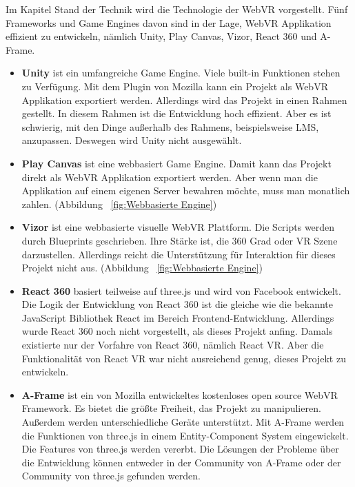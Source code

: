  Im Kapitel Stand der Technik wird die Technologie der WebVR vorgestellt. Fünf Frameworks und Game Engines davon sind in der Lage, WebVR Applikation effizient zu entwickeln, nämlich Unity, Play Canvas, Vizor, React 360 und A-Frame.
 
 \begin{itemize}
 
     \item \textbf{Unity} \citep{37} ist ein umfangreiche Game Engine. Viele built-in Funktionen stehen zu Verfügung. Mit dem Plugin von Mozilla kann ein Projekt als WebVR Applikation exportiert werden. Allerdings wird das Projekt in einen Rahmen gestellt. In diesem Rahmen ist die Entwicklung hoch effizient. Aber es ist schwierig, mit den Dinge außerhalb des Rahmens, beispielsweise LMS, anzupassen. Deswegen wird Unity nicht ausgewählt.
     
     \item \textbf{Play Canvas} \citep{38} ist eine webbasiert Game Engine. Damit kann das Projekt direkt als WebVR Applikation exportiert werden. Aber wenn man die Applikation auf einem eigenen Server bewahren möchte, muss man monatlich zahlen. (Abbildung ~\ref{fig:Webbasierte Engine})
     
     \item \textbf{Vizor} \citep{39} ist eine webbasierte visuelle WebVR Plattform. Die Scripts werden durch Blueprints geschrieben. Ihre Stärke ist, die 360 Grad oder VR Szene darzustellen. Allerdings reicht die Unterstützung für Interaktion für dieses Projekt nicht aus. (Abbildung ~\ref{fig:Webbasierte Engine})
     
     \item \textbf{React 360} \citep{40} basiert teilweise auf three.js und wird von Facebook entwickelt. Die Logik der Entwicklung von React 360 ist die gleiche wie die bekannte JavaScript Bibliothek React im Bereich Frontend-Entwicklung. Allerdings wurde React 360 noch nicht vorgestellt, als dieses Projekt anfing. Damals existierte nur der Vorfahre von React 360, nämlich React VR. Aber die Funktionalität von React VR war nicht ausreichend genug, dieses Projekt zu entwickeln.
     
     \item \textbf{A-Frame} \citep{41} ist ein von Mozilla entwickeltes kostenloses open source WebVR Framework. Es bietet die größte Freiheit, das Projekt zu manipulieren. Außerdem werden unterschiedliche Geräte unterstützt. Mit A-Frame werden die Funktionen von three.js in einem Entity-Component System eingewickelt. Die Features von three.js werden vererbt. Die Lösungen der Probleme über die Entwicklung können entweder in der Community von A-Frame oder der Community von three.js gefunden werden.
     
 \end{itemize}
 
